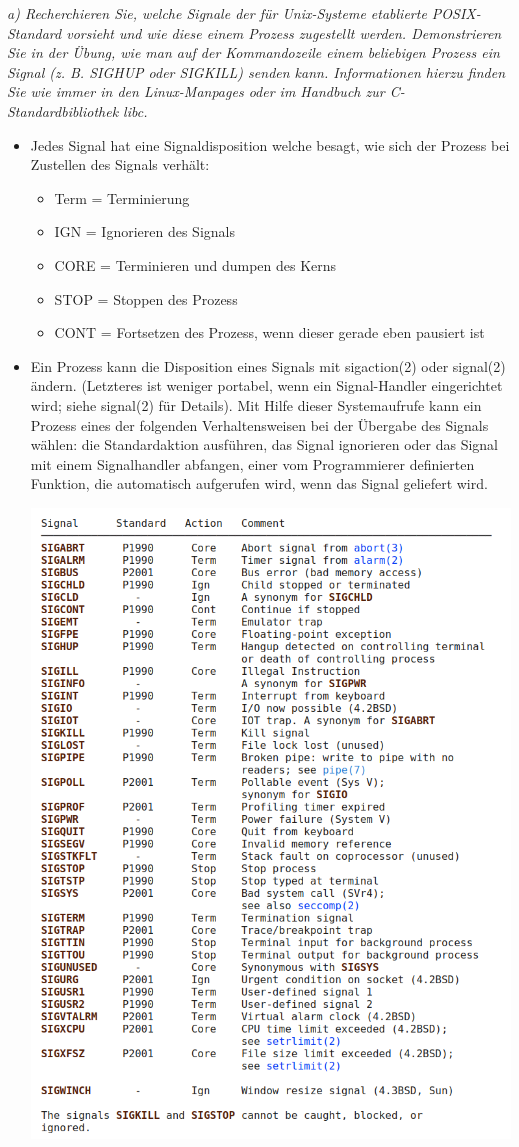 \documentclass[a4paper]{article}
\begin{document}
\textit{a) Recherchieren Sie, welche Signale der für Unix-Systeme etablierte POSIX-Standard vorsieht und wie diese einem Prozess zugestellt werden. Demonstrieren Sie in der Übung, wie man auf der Kommandozeile einem beliebigen Prozess ein Signal (z. B. SIGHUP oder SIGKILL) senden kann.
    Informationen hierzu finden Sie wie immer in den Linux-Manpages oder im Handbuch zur C-Standardbibliothek libc.}
\vspace{10mm}
\begin{itemize}
    \item Jedes Signal hat eine Signaldisposition welche besagt, wie sich der Prozess bei Zustellen des Signals verhält:
          \begin{itemize}
              \item Term = Terminierung
              \item IGN = Ignorieren des Signals
              \item CORE = Terminieren und dumpen des Kerns
              \item STOP = Stoppen des Prozess
              \item CONT = Fortsetzen des Prozess, wenn dieser gerade eben pausiert ist
          \end{itemize}
    \item Ein Prozess kann die Disposition eines Signals mit sigaction(2) oder signal(2) ändern.  (Letzteres ist weniger portabel, wenn ein Signal-Handler eingerichtet wird; siehe signal(2) für Details). Mit Hilfe dieser Systemaufrufe kann ein Prozess eines der folgenden Verhaltensweisen bei der Übergabe des Signals wählen: die Standardaktion ausführen, das Signal ignorieren oder das Signal mit einem Signalhandler abfangen, einer vom Programmierer definierten Funktion, die automatisch aufgerufen wird, wenn das Signal geliefert wird.
          \begin{center}
              \includegraphics[width=0.5\linewidth]{Assets/Betriebssysteme_uebung/u6_a2.png}

\end{center}
\end{itemize}
\end{document}
